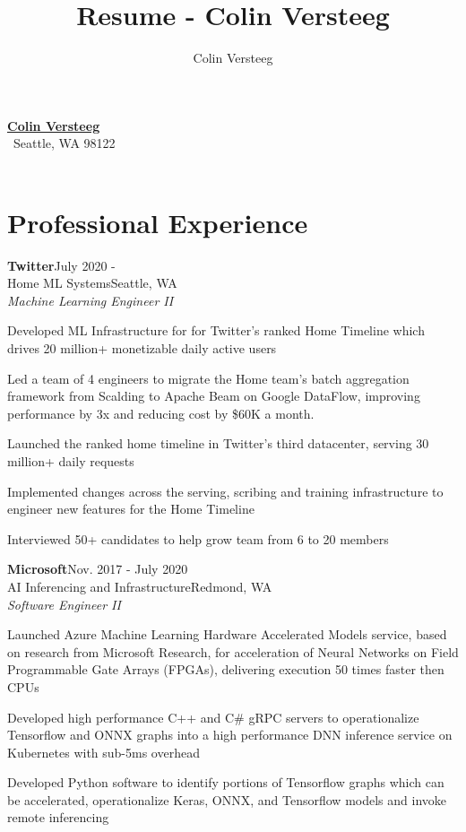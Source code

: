\documentclass[letterpaper,11pt]{article}
\title{Resume - Colin Versteeg}
\author{Colin Versteeg}
\def \jobskip{1em}
\newcommand{\resentry}[6]{
\large{\sffamily\textbf{#1}}\hfill{\rmfamily\normalsize\textcolor{faded}{#2}} \\
\normalsize{#3}\hfill{\textcolor{faded}{\normalsize#4}}\\
\normalsize{#5}
\footnotesize{#6}
}
\begin{document}
\begin{center}
    \href{http://www.linkedin.com/pub/colin-versteeg/5b/26b/1b8}{{\huge\bf\sffamily Colin Versteeg}} \\
\ifdefined\PRINTADDRESS   
{\rmfamily {}} \textbullet \, Seattle, WA 98122 \\ 
\fi
\ifdefined\PRINTPHONE
{\rmfamily {}} \textbullet \,
\fi
 {\rmfamily {}}
\end{center}
\section*{Professional Experience}
\resentry{{Twitter}}{July 2020 \--}{Home ML Systems}{Seattle, WA}{\emph{Machine Learning Engineer II}}
{ 
      \begin{resumeitemize}
	\item{Developed ML Infrastructure for for Twitter's ranked Home Timeline which drives 20 million+ monetizable daily active users}
	\item{Led a team of 4 engineers to migrate the Home team's batch aggregation framework from Scalding to Apache Beam on Google DataFlow, improving performance by 3x and reducing cost by \$60K a month.}
	\item{Launched the ranked home timeline in Twitter's third datacenter, serving 30 million+ daily requests}
	\item{Implemented changes across the serving, scribing and training infrastructure to engineer new features for the Home Timeline}
	 \item{Interviewed 50+ candidates to help grow team from 6 to 20 members}	
          \end{resumeitemize}
}
\vspace{\jobskip}
\resentry{{Microsoft}}{Nov. 2017 \-- July 2020}{AI Inferencing and Infrastructure}{Redmond, WA}{\emph{Software Engineer II}}
{ 
      \begin{resumeitemize}
	 \item{Launched Azure Machine Learning Hardware Accelerated Models service, based on research from Microsoft Research, for acceleration of Neural Networks on Field Programmable Gate Arrays (FPGAs), delivering execution 50 times faster then CPUs}	
	\item{Developed high performance C++ and C\# gRPC servers to operationalize Tensorflow and ONNX graphs into a high performance DNN inference service on Kubernetes with sub-5ms overhead}
	\item{Developed Python software to identify portions of Tensorflow graphs which can be accelerated, operationalize Keras, ONNX, and Tensorflow models and invoke remote inferencing}
          \end{resumeitemize}
}
\end{document}
